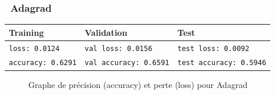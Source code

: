 	\subsubsection*{\qquad \textbullet \ Adagrad}
		\begin{table}[H]
			\centering
			\begin{tabular}{l|l|l}
				\hline
				\textbf{Training} & \textbf{Validation} & \textbf{Test} \\
				\hline

				\texttt{loss: 0.0124} & \texttt{val loss: 0.0156} & \texttt{test loss: 0.0092} \\
				\texttt{accuracy: 0.6291} & \texttt{val accuracy: 0.6591} & \texttt{test accuracy: 0.5946} \\
				
				\hline
				
			\end{tabular}
		\end{table}
		\begin{figure}[H]
			\myfloatalign
			 \quad
			
			\caption[]{Graphe de précision (accuracy) et perte (loss)  pour Adagrad}
		\end{figure}
